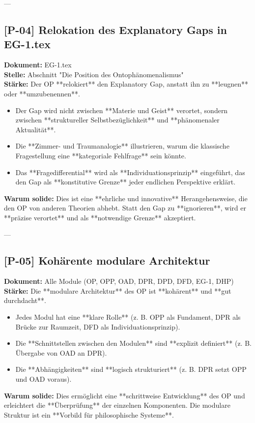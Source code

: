 \documentclass[11pt,a4paper]{article}
\begin{document}
---
\subsection*{[P-04] Relokation des Explanatory Gaps in EG-1.tex}
\textbf{Dokument:} EG-1.tex \\
\textbf{Stelle:} Abschnitt "Die Position des Ontophänomenalismus" \\
\textbf{Stärke:}
Der OP **relokiert** den Explanatory Gap, anstatt ihn zu **leugnen** oder **umzubenennen**.
\begin{itemize}
    \item Der Gap wird nicht zwischen **Materie und Geist** verortet, sondern zwischen **struktureller Selbstbezüglichkeit** und **phänomenaler Aktualität**.
    \item Die **Zimmer- und Traumanalogie** illustrieren, warum die klassische Fragestellung eine **kategoriale Fehlfrage** sein könnte.
    \item Das **Fragedifferential** wird als **Individuationsprinzip** eingeführt, das den Gap als **konstitutive Grenze** jeder endlichen Perspektive erklärt.
\end{itemize}
\textbf{Warum solide:}
Dies ist eine **ehrliche und innovative** Herangehensweise, die den OP von anderen Theorien abhebt. Statt den Gap zu **ignorieren**, wird er **präzise verortet** und als **notwendige Grenze** akzeptiert.

---
\subsection*{[P-05] Kohärente modulare Architektur}
\textbf{Dokument:} Alle Module (OP, OPP, OAD, DPR, DPD, DFD, EG-1, DHP) \\
\textbf{Stärke:}
Die **modulare Architektur** des OP ist **kohärent** und **gut durchdacht**.
\begin{itemize}
    \item Jedes Modul hat eine **klare Rolle** (z. B. OPP als Fundament, DPR als Brücke zur Raumzeit, DFD als Individuationsprinzip).
    \item Die **Schnittstellen zwischen den Modulen** sind **explizit definiert** (z. B. Übergabe von OAD an DPR).
    \item Die **Abhängigkeiten** sind **logisch strukturiert** (z. B. DPR setzt OPP und OAD voraus).
\end{itemize}
\textbf{Warum solide:}
Dies ermöglicht eine **schrittweise Entwicklung** des OP und erleichtert die **Überprüfung** der einzelnen Komponenten. Die modulare Struktur ist ein **Vorbild für philosophische Systeme**.
\end{document}
